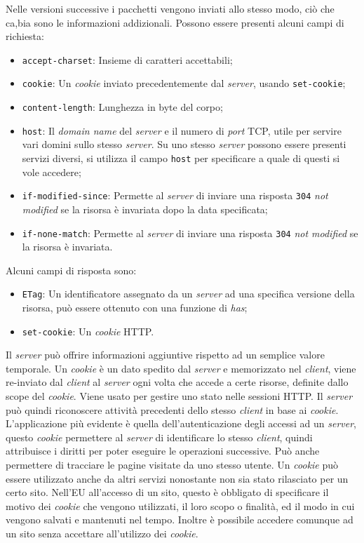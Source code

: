\documentclass{article}
\numberwithin{equation}{subsection}
\begin{document}
Nelle versioni successive i pacchetti vengono inviati allo stesso modo, ciò che ca,bia sono le informazioni addizionali. 
Possono essere presenti alcuni campi di richiesta:
\begin{itemize}
    \item \verb|accept-charset|: Insieme di caratteri accettabili;
    \item \verb|cookie|: Un \textit{cookie} inviato precedentemente dal \textit{server}, usando \verb|set-cookie|;
    \item \verb|content-length|: Lunghezza in byte del corpo;
    \item \verb|host|: Il \textit{domain name} del \textit{server} e il numero di \textit{port} \textcolor{Bittersweet}{TCP}, utile per servire vari domini sullo stesso \textit{server}. Su uno stesso \textit{server} possono essere presenti servizi diversi, si utilizza il campo \verb|host| per specificare a quale di questi si vole accedere;
    \item \verb|if-modified-since|: Permette al \textit{server} di inviare una risposta \verb|304| \textit{not modified} se la risorsa è invariata dopo la data specificata; 
    \item \verb|if-none-match|: Permette al \textit{server} di inviare una risposta \verb|304| \textit{not modified} se la risorsa è invariata. 
\end{itemize}
Alcuni campi di risposta sono:
\begin{itemize}
    \item \verb|ETag|: Un identificatore assegnato da un \textit{server} ad una specifica versione della risorsa, può essere ottenuto con una funzione di \textit{has};
    \item \verb|set-cookie|: Un \textit{cookie} \textcolor{NavyBlue}{HTTP}. 
\end{itemize}
Il \textit{server} può 
offrire informazioni aggiuntive rispetto ad un semplice valore temporale. 
Un \textit{cookie} è un dato spedito dal \textit{server} e memorizzato nel \textit{client}, viene re-inviato dal \textit{client} al \textit{server} ogni volta che accede a certe risorse, definite dallo scope del \textit{cookie}. 
Viene usato per gestire uno stato nelle sessioni \textcolor{NavyBlue}{HTTP}. Il \textit{server} può quindi riconoscere attività precedenti dello stesso \textit{client} in base ai \textit{cookie}. 
L'applicazione più evidente è quella dell'autenticazione degli accessi ad un \textit{server}, questo \textit{cookie} permettere al \textit{server} di identificare lo stesso \textit{client}, quindi attribuisce 
i diritti per poter eseguire le operazioni successive. 
Può anche permettere di tracciare le pagine visitate da uno stesso utente. Un \textit{cookie} può essere utilizzato anche da altri servizi nonostante non sia stato rilasciato per 
un certo sito. Nell'EU all'accesso di un sito, questo è obbligato di specificare il motivo dei \textit{cookie} che vengono utilizzati, il loro scopo o finalità, ed il modo in cui 
vengono salvati e mantenuti nel tempo. Inoltre è possibile accedere comunque ad un sito senza accettare all'utilizzo dei \textit{cookie}. 
\end{document}
